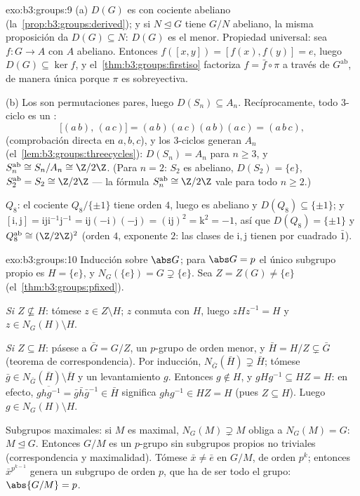 \begin{solution}{exo:b3:groups:9}
(a) $D(G)$ es  con cociente
abeliano (la~\cref{prop:b3:groups:derived}); y si $N \trianglelefteq G$
tiene $G/N$ abeliano, la misma proposición da $D(G) \subseteq N$: $D(G)$
es el menor. Propiedad universal: sea $f \colon G \to A$ con $A$
abeliano. Entonces $f([x,y]) = [f(x), f(y)] = e$, luego $D(G)
\subseteq \ker f$, y el~\cref{thm:b3:groups:firstiso} factoriza $f =
\bar f \circ \pi$ a través de $G^{\mathrm{ab}}$, de manera única porque
$\pi$ es sobreyectiva.

(b) Los  son permutaciones
pares, luego $D(S_n) \subseteq A_n$. Recíprocamente, todo $3$-ciclo es
un :
\[
\bigl[(a\,b),\,(a\,c)\bigr] = (a\,b)(a\,c)(a\,b)(a\,c) =
(a\,b\,c),
\]
(comprobación directa en $a, b, c$), y los $3$-ciclos generan $A_n$
(el~\cref{lem:b3:groups:threecycles}): $D(S_n) = A_n$ para $n \geq 3$, y
$S_n^{\mathrm{ab}} \cong S_n/A_n \cong \Z/2\Z$. (Para $n = 2$: $S_2$ es
abeliano, $D(S_2) = \{e\}$, $S_2^{\mathrm{ab}} = S_2
\cong \Z/2\Z$ --- la fórmula $S_n^{\mathrm{ab}} \cong \Z/2\Z$ vale para
todo $n \geq 2$.)

$Q_8$: el cociente $Q_8/\{\pm 1\}$ tiene orden $4$, luego es abeliano y
$D(Q_8) \subseteq \{\pm 1\}$; y $[\mathrm i, \mathrm
j] = \mathrm i \mathrm j \mathrm i^{-1}\mathrm j^{-1} = \mathrm
i\mathrm j(-\mathrm i)(-\mathrm j) = (\mathrm i \mathrm j)^2 =
\mathrm k^2 = -1$, así que $D(Q_8) = \{\pm 1\}$ y
$Q_8^{\mathrm{ab}} \cong (\Z/2\Z)^2$ (orden $4$, exponente $2$: las
clases de $\mathrm i, \mathrm j$ tienen por cuadrado $\bar 1$).
\end{solution}

\begin{solution}{exo:b3:groups:10}
Inducción sobre $\abs G$; para $\abs G = p$ el único subgrupo propio es
$H = \{e\}$, y $N_G(\{e\}) = G \supsetneq
\{e\}$. Sea $Z = Z(G) \neq \{e\}$ (el~\cref{thm:b3:groups:pfixed}).

\emph{Si $Z \not\subseteq H$}: tómese $z \in Z \setminus H$; $z$ conmuta
con $H$, luego $zHz^{-1} = H$ y $z \in N_G(H) \setminus
H$.

\emph{Si $Z \subseteq H$}: pásese a $\bar G = G/Z$, un $p$-grupo de
orden menor, y $\bar H = H/Z \subsetneq \bar G$ (teorema de
correspondencia). Por inducción, $N_{\bar G}(\bar H) \supsetneq \bar H$;
tómese $\bar g \in N_{\bar G}(\bar H) \setminus \bar H$ y un
levantamiento $g$. Entonces $g \notin H$, y $gHg^{-1} \subseteq HZ = H$:
en efecto, $\overline{ghg^{-1}} = \bar g \bar h \bar g^{-1} \in \bar H$
significa $ghg^{-1} \in HZ = H$ (pues $Z \subseteq H$). Luego $g \in
N_G(H)\setminus H$.

Subgrupos maximales: si $M$ es maximal, $N_G(M) \supsetneq M$ obliga a
$N_G(M) = G$: $M \trianglelefteq G$. Entonces $G/M$ es un $p$-grupo sin
subgrupos propios no triviales (correspondencia y maximalidad). Tómese
$\bar x \neq \bar e$ en $G/M$, de orden $p^k$; entonces
$\bar x^{p^{k-1}}$ genera un subgrupo de orden $p$, que ha de ser todo
el grupo: $\abs{G/M} = p$.
\end{solution}

